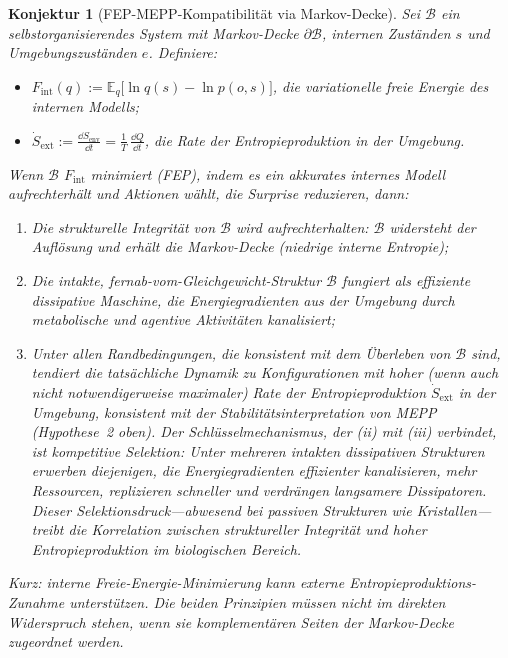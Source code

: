 \documentclass[12pt,a4paper]{article}
\newtheorem{conjecture}{Konjektur}
\theoremstyle{remark}
\begin{document}
\begin{conjecture}[FEP-MEPP-Kompatibilität via Markov-Decke]
\label{conj:fep-mepp}
Sei $\mathcal{B}$ ein selbstorganisierendes System mit Markov-Decke $\partial\mathcal{B}$, internen Zuständen $s$ und Umgebungszuständen $e$. Definiere:
\begin{itemize}
  \item $F_{\mathrm{int}}(q) :=
    \mathbb{E}_{q}\!\bigl[\ln q(s) - \ln p(o, s)\bigr]$,
    die variationelle freie Energie des internen Modells;
  \item $\dot{S}_{\mathrm{ext}} :=
    \frac{\dd S_{\mathrm{env}}}{\dd t} =
    \frac{1}{T}\,\frac{\dd Q}{\dd t}$,
    die Rate der Entropieproduktion in der Umgebung.
\end{itemize}
Wenn $\mathcal{B}$ $F_{\mathrm{int}}$ minimiert (FEP), indem es ein akkurates internes Modell aufrechterhält und Aktionen wählt, die Surprise reduzieren, dann:
\begin{enumerate}
  \item[\emph{(i)}] Die strukturelle Integrität von $\mathcal{B}$ wird aufrechterhalten: $\mathcal{B}$ widersteht der Auflösung und erhält die Markov-Decke (niedrige interne Entropie);
  \item[\emph{(ii)}] Die intakte, fernab-vom-Gleichgewicht-Struktur $\mathcal{B}$ fungiert als effiziente dissipative Maschine, die Energiegradienten aus der Umgebung durch metabolische und agentive Aktivitäten kanalisiert;
  \item[\emph{(iii)}] Unter allen Randbedingungen, die konsistent mit dem Überleben von $\mathcal{B}$ sind, tendiert die tatsächliche Dynamik zu Konfigurationen mit hoher (wenn auch nicht notwendigerweise maximaler) Rate der Entropieproduktion $\dot{S}_{\mathrm{ext}}$ in der Umgebung, konsistent mit der Stabilitätsinterpretation von MEPP (Hypothese~2 oben). Der Schlüsselmechanismus, der (ii) mit (iii) verbindet, ist \emph{kompetitive Selektion}: Unter mehreren intakten dissipativen Strukturen erwerben diejenigen, die Energiegradienten effizienter kanalisieren, mehr Ressourcen, replizieren schneller und verdrängen langsamere Dissipatoren. Dieser Selektionsdruck---abwesend bei passiven Strukturen wie Kristallen---treibt die Korrelation zwischen struktureller Integrität und hoher Entropieproduktion im biologischen Bereich.
\end{enumerate}
Kurz: \emph{interne Freie-Energie-Minimierung kann externe Entropieproduktions-Zunahme unterstützen}. Die beiden Prinzipien müssen nicht im direkten Widerspruch stehen, wenn sie komplementären Seiten der Markov-Decke zugeordnet werden.
\end{conjecture}
\end{document}
